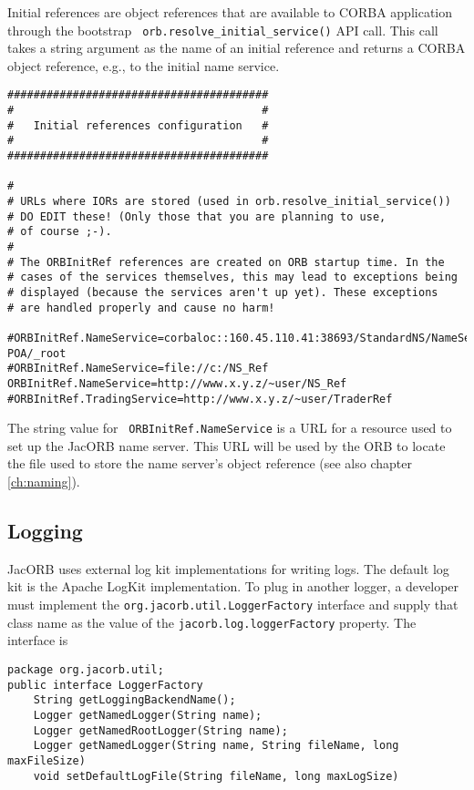 {{Initial references are object references that are available to CORBA
application through the bootstrap {\tt
  orb.resolve\_initial\_service()} API call. This call takes a string
argument as the name of an initial reference and returns a CORBA
object reference, e.g., to the initial name service.

\renewcommand{\baselinestretch}{0.9}
\small{
\begin{verbatim}
########################################
#                                      #
#   Initial references configuration   #
#                                      #
########################################

#
# URLs where IORs are stored (used in orb.resolve_initial_service())
# DO EDIT these! (Only those that you are planning to use,
# of course ;-).
#
# The ORBInitRef references are created on ORB startup time. In the
# cases of the services themselves, this may lead to exceptions being
# displayed (because the services aren't up yet). These exceptions
# are handled properly and cause no harm!

#ORBInitRef.NameService=corbaloc::160.45.110.41:38693/StandardNS/NameServer-POA/_root
#ORBInitRef.NameService=file://c:/NS_Ref
ORBInitRef.NameService=http://www.x.y.z/~user/NS_Ref
#ORBInitRef.TradingService=http://www.x.y.z/~user/TraderRef
\end{verbatim}
}
\renewcommand{\baselinestretch}{1.0}
\small\normalsize

The  string value  for  {\tt
ORBInitRef.NameService} is  a URL  for a resource  used to set  up the
JacORB name  server. This URL  will be used  by the ORB to  locate the
file  used to  store  the  name server's  object  reference (see  also
chapter \ref{ch:naming}).

\subsection{Logging}

JacORB uses external log kit implementations for writing logs. The default log
kit is the Apache LogKit implementation. To plug in another logger, a developer
must implement the {\tt org.jacorb.util.LoggerFactory} interface and supply that
class name as the value of the {\tt jacorb.log.loggerFactory} property.
\filbreak
The interface is
\begin{small}
\begin{verbatim}
package org.jacorb.util;
public interface LoggerFactory
    String getLoggingBackendName();
    Logger getNamedLogger(String name);
    Logger getNamedRootLogger(String name);
    Logger getNamedLogger(String name, String fileName, long maxFileSize)
    void setDefaultLogFile(String fileName, long maxLogSize)
\end{verbatim}
\end{small}

}}
